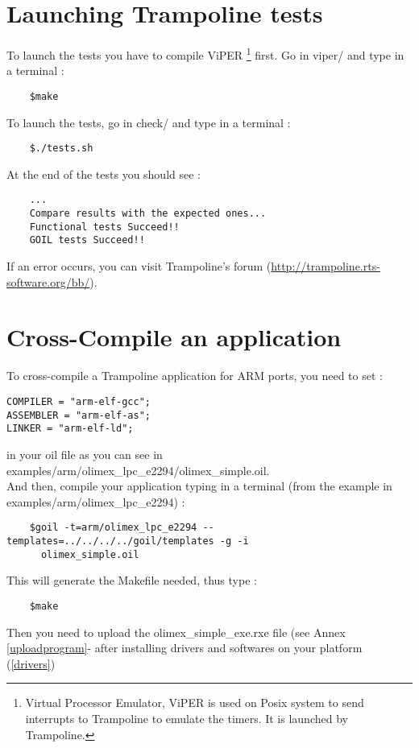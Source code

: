 \section{Launching Trampoline tests} \label{tests}
To launch the tests you have to compile ViPER \footnote{Virtual Processor Emulator, ViPER is used on Posix system to send interrupts to Trampoline to emulate the timers. It is launched by Trampoline.} first. Go in viper/ and type in a terminal :
	\begin{verbatim}
	$make
	\end{verbatim}
To launch the tests, go in check/ and type in a terminal :
	\begin{verbatim}
	$./tests.sh
	\end{verbatim}
At the end of the tests you should see :
	\begin{verbatim}
	...
	Compare results with the expected ones...
	Functional tests Succeed!!
	GOIL tests Succeed!!
	\end{verbatim}
If an error occurs, you can visit Trampoline's forum (\href{http://trampoline.rts-software.org/bb/}{http://trampoline.rts-software.org/bb/}).


\section{Cross-Compile an application} \label{compileanapplication}
To cross-compile a Trampoline application for ARM ports, you need to set  :
\begin{verbatim}
COMPILER = "arm-elf-gcc";
ASSEMBLER = "arm-elf-as";
LINKER = "arm-elf-ld";
\end{verbatim}
in your oil file as you can see in examples/arm/olimex_lpc_e2294/olimex\_simple.oil.\\

And then, compile your application typing in a terminal (from the example in examples/arm/olimex_lpc_e2294) :
	\begin{verbatim}
	$goil -t=arm/olimex_lpc_e2294 --templates=../../../../goil/templates -g -i
	  olimex_simple.oil
	\end{verbatim}
This will generate the Makefile needed, thus type :
	\begin{verbatim}
	$make
	\end{verbatim}
Then you need to upload the olimex\_simple\_exe.rxe file (see Annex \ref{uploadprogram}- after installing drivers and softwares on your platform (\ref{drivers})


